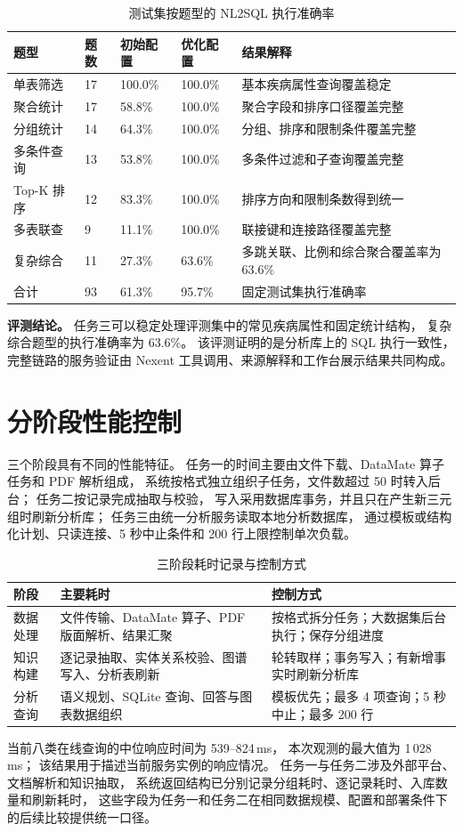 \begin{table}[H]
\centering
\small
\caption{测试集按题型的 NL2SQL 执行准确率}
\label{tab:task3-nl2sql-by-type}
\begin{tabularx}{\textwidth}{L{2.8cm}C{1.1cm}C{1.8cm}C{1.8cm}Y}
\toprule
\textbf{题型} & \textbf{题数} & \textbf{初始配置} & \textbf{优化配置} & \textbf{结果解释} \\
\midrule
单表筛选 & 17 & 100.0\% & 100.0\% & 基本疾病属性查询覆盖稳定 \\
聚合统计 & 17 & 58.8\% & 100.0\% & 聚合字段和排序口径覆盖完整 \\
分组统计 & 14 & 64.3\% & 100.0\% & 分组、排序和限制条件覆盖完整 \\
多条件查询 & 13 & 53.8\% & 100.0\% & 多条件过滤和子查询覆盖完整 \\
Top-K 排序 & 12 & 83.3\% & 100.0\% & 排序方向和限制条数得到统一 \\
多表联查 & 9 & 11.1\% & 100.0\% & 联接键和连接路径覆盖完整 \\
复杂综合 & 11 & 27.3\% & 63.6\% & 多跳关联、比例和综合聚合覆盖率为 63.6\% \\
\midrule
合计 & 93 & 61.3\% & 95.7\% & 固定测试集执行准确率 \\
\bottomrule
\end{tabularx}
\end{table}

\textbf{评测结论。}
任务三可以稳定处理评测集中的常见疾病属性和固定统计结构，
复杂综合题型的执行准确率为 63.6\%。
该评测证明的是分析库上的 SQL 执行一致性，
完整链路的服务验证由 Nexent 工具调用、来源解释和工作台展示结果共同构成。

\section{分阶段性能控制}

三个阶段具有不同的性能特征。
任务一的时间主要由文件下载、DataMate 算子任务和 PDF 解析组成，
系统按格式独立组织子任务，文件数超过 50 时转入后台；
任务二按记录完成抽取与校验，
写入采用数据库事务，并且只在产生新三元组时刷新分析库；
任务三由统一分析服务读取本地分析数据库，
通过模板或结构化计划、只读连接、5 秒中止条件和 200 行上限控制单次负载。

\begin{table}[H]
\centering
\caption{三阶段耗时记录与控制方式}
\label{tab:performance-controls}
\begin{tabularx}{\textwidth}{L{2.3cm}L{5.3cm}Y}
\toprule
\textbf{阶段} & \textbf{主要耗时} & \textbf{控制方式} \\
\midrule
数据处理 &
文件传输、DataMate 算子、PDF 版面解析、结果汇聚 &
按格式拆分任务；大数据集后台执行；保存分组进度 \\
\addlinespace
知识构建 &
逐记录抽取、实体关系校验、图谱写入、分析表刷新 &
轮转取样；事务写入；有新增事实时刷新分析库 \\
\addlinespace
分析查询 &
语义规划、SQLite 查询、回答与图表数据组织 &
模板优先；最多 4 项查询；5 秒中止；最多 200 行 \\
\bottomrule
\end{tabularx}
\end{table}

当前八类在线查询的中位响应时间为 539--824\,ms，
本次观测的最大值为 1\,028\,ms；
该结果用于描述当前服务实例的响应情况。
任务一与任务二涉及外部平台、文档解析和知识抽取，
系统返回结构已分别记录分组耗时、逐记录耗时、入库数量和刷新耗时，
这些字段为任务一和任务二在相同数据规模、配置和部署条件下的后续比较提供统一口径。
